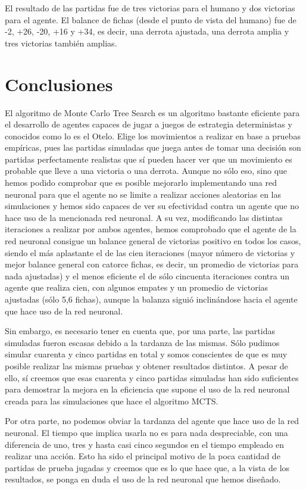 \documentclass[conference]{IEEEtran}
\begin{document}
El resultado de las partidas fue de tres victorias para el humano y dos victorias para el agente. El balance de fichas (desde el punto de vista del humano) fue de -2, +26, -20, +16 y +34, es decir, una derrota ajustada, una derrota amplia y tres victorias también amplias.

\section{Conclusiones}
El algoritmo de Monte Carlo Tree Search es un algoritmo bastante eficiente para el desarrollo de agentes capaces de jugar a juegos de estrategia deterministas y conocidos como lo es el Otelo. Elige los movimientos a realizar en base a pruebas empíricas, pues las partidas simuladas que juega antes de tomar una decisión son partidas perfectamente realistas que sí pueden hacer ver que un movimiento es probable que lleve a una victoria o una derrota. Aunque no sólo eso, sino que hemos podido comprobar que es posible mejorarlo implementando una red neuronal para que el agente no se limite a realizar acciones aleatorias en las simulaciones y hemos sido capaces de ver su efectividad contra un agente que no hace uso de la mencionada red neuronal. A su vez, modificando las distintas iteraciones a realizar por ambos agentes, hemos comprobado que el agente de la red neuronal consigue un balance general de victorias positivo en todos los casos, siendo el más aplastante el de las cien iteraciones (mayor número de victorias y mejor balance general con catorce fichas, es decir, un promedio de victorias para nada ajustadas) y el menos eficiente el de sólo cincuenta iteraciones contra un agente que realiza cien, con algunos empates y un promedio de victorias ajustadas (sólo 5,6 fichas), aunque la balanza siguió inclinándose hacia el agente que hace uso de la red neuronal. 

Sin embargo, es necesario tener en cuenta que, por una parte, las partidas simuladas fueron escasas debido a la tardanza de las mismas. Sólo pudimos simular cuarenta y cinco partidas en total y somos conscientes de que es muy posible realizar las mismas pruebas y obtener resultados distintos. A pesar de ello, sí creemos que esas cuarenta y cinco partidas simuladas han sido suficientes para demostrar la mejora en la eficiencia que supone el uso de la red neuronal creada para las simulaciones que hace el algoritmo MCTS.

Por otra parte, no podemos obviar la tardanza del agente que hace uso de la red neuronal. El tiempo que implica usarla no es para nada despreciable, con una diferencia de uno, tres y hasta casi cinco segundos en el tiempo empleado en realizar una acción. Esto ha sido el principal motivo de la poca cantidad de partidas de prueba jugadas y creemos que es lo que hace que, a la vista de los resultados, se ponga en duda el uso de la red neuronal que hemos diseñado.
\end{document}
